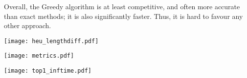 Overall, the {\sc Greedy} algorithm is at least competitive, and often more accurate than exact methods;
it is also significantly faster.
Thus, it is hard to favour any other approach.



\begin{figure*}[!t]
		\quad
		\centering
		\texttt{[image: heu\_lengthdiff.pdf]}
	    \label{fig:length-christo}
\end{figure*}%
\begin{figure*}[!t]
		\quad
		\centering
		\texttt{[image: metrics.pdf]}
	    \label{fig:acc-vs-length}
\end{figure*}%
\begin{figure*}[!t]
		\centering
		\texttt{[image: top1\_inftime.pdf]}
	    \label{fig:inftime}
\end{figure*}%
